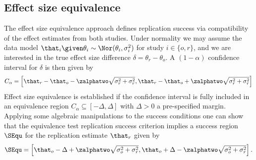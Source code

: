 \begin{subappendices}
\subsection{Effect size equivalence}
The effect size equivalence approach \citep{Anderson2016} defines replication
success via compatibility of the effect estimates from both studies. Under
normality we may assume the data model
$\that_{i} \given \theta_{i} \sim \Nor(\theta_{i}, \sigma^{2}_{i})$ for study
$i \in \{o, r\}$, and we are interested in the true effect size difference
$\delta = \theta_{r} - \theta_{o}$. A $(1 - \alpha)$ confidence interval for
$\delta$ is then given by
\begin{align*}
  C_{\alpha} = \left[\that_{r} - \that_{o} - \zalphatwo \sqrt{\sigma^{2}_{r} + \sigma^{2}_{r}},
  \that_{r} - \that_{o} + \zalphatwo \sqrt{\sigma^{2}_{r} + \sigma^{2}_{r}}\right]
\end{align*}
Effect size equivalence is established if the confidence interval is fully
included in an equivalence region $C_{\alpha} \subseteq [-\Delta, \Delta]$ with
$\Delta > 0$ a pre-specified margin. Applying some algebraic manipulations to
the success conditions one can show that the equivalence test replication success
criterion implies a success region $\SEqu$ for the replication estimate
$\that_{r}$ given by
\begin{align*}
  \SEqu
  = \left[\that_{o} - \Delta + \zalphatwo \sqrt{\sigma^{2}_{o} +
  \sigma^{2}_{r}}, \that_{o} + \Delta - \zalphatwo
  \sqrt{\sigma^{2}_{o} + \sigma^{2}_{r}}\right].
\end{align*}



\end{subappendices}
